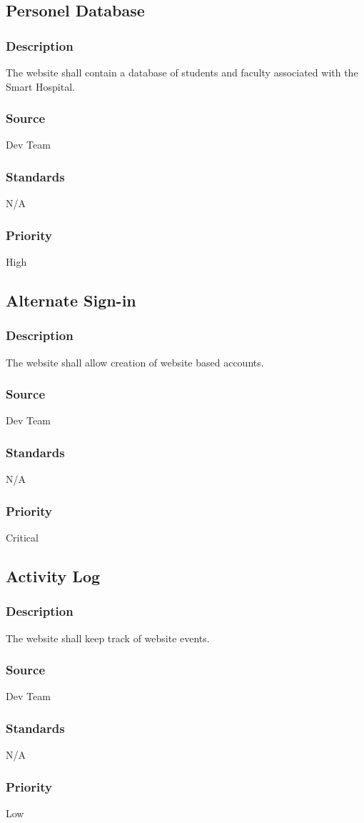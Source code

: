 \subsection{Personel Database}
\subsubsection{Description}
The website shall contain a database of students and faculty associated with the Smart Hospital.
\subsubsection{Source}
Dev Team
\subsubsection{Standards}
N/A
\subsubsection{Priority}
High

\subsection{Alternate Sign-in}
\subsubsection{Description}
The website shall allow creation of website based accounts.
\subsubsection{Source}
Dev Team
\subsubsection{Standards}
N/A
\subsubsection{Priority}
Critical

\subsection{Activity Log}
\subsubsection{Description}
The website shall keep track of website events.
\subsubsection{Source}
Dev Team
\subsubsection{Standards}
N/A
\subsubsection{Priority}
Low
